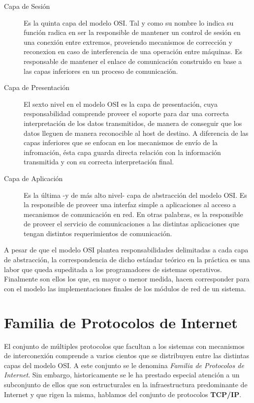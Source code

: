 \begin{description}
\item[Capa de Sesión] Es la quinta capa del modelo OSI. Tal y como su nombre lo indica su función radica en ser la responsible de mantener un control de sesión en una conexión entre extremos, proveiendo mecanismos de corrección y reconexion en caso de interferencia de una operación entre máquinas. Es responsable de mantener el enlace de comunicación construido en base a las capas inferiores en un proceso de comunicación.

\item[Capa de Presentación] El sexto nivel en el modelo OSI es la capa de presentación, cuya responsabilidad comprende proveer el soporte para dar una correcta interpretación de los datos transmitidos, de manera de conseguir que los datos lleguen de manera reconocible al host de destino. A diferencia de las capas inferiores que se enfocan en los mecanismos de envío de la infromación, ésta capa guarda directa relación con la información transmitida y con su correcta interpretación final.

\item[Capa de Aplicación] Es la última -y de más alto nivel- capa de abstracción del modelo OSI. Es la responsible de proveer una interfaz simple a aplicaciones al acceso a mecanismos de comunicación en red. En otras palabras, es la responsible de proveer el servicio de comunicaciones a las distintas aplicaciones que tengan distintos requerimientos de comunicación.

\end{description}

A pesar de que el modelo OSI plantea responsabilidades delimitadas a cada capa de abstracción, la correspondencia de dicho estándar teórico en la práctica es una labor que queda supeditada a los programadores de sistemas operativos. Finalmente son ellos los que, en mayor o menor medida, hacen corresponder para con el modelo las implementaciones finales de los módulos de red de un sistema.


\section{Familia de Protocolos de Internet}
El conjunto de múltiples protocolos que facultan a los sistemas con mecanismos de interconexión comprende a varios cientos que se distribuyen entre las distintas capas del modelo OSI. A este conjunto se le denomina \emph{Familia de Protocolos de Internet}. Sin embargo, historicamente se le ha prestado especial atención a un subconjunto de ellos que son estructurales en la infraestructura predominante de Internet y que rigen la misma, hablamos del conjunto de protocolos \textbf{TCP/IP}.

